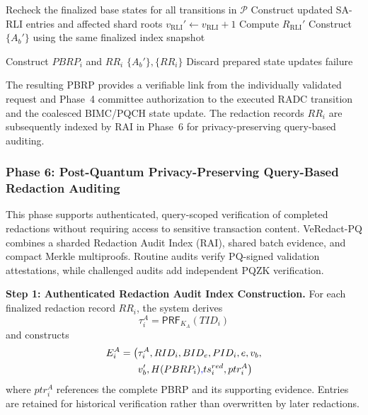 \documentclass[lettersize,journal]{IEEEtran}
\begin{document}
\begin{algorithm}[t]
\begin{algorithmic}[1]
\State Recheck the finalized base states
for all transitions in $\mathcal{P}$
\State Construct updated SA-RLI entries
and affected shard roots
\State $v_{\mathrm{RLI}}'\gets
v_{\mathrm{RLI}}+1$
\State Compute $R_{\mathrm{RLI}}'$
\State Construct $\{A_b'\}$ using the
same finalized index snapshot

        \State Construct $PBRP_i$
        and $RR_i$
    \EndFor
    \State \Return
    $\{A_b'\},\{RR_i\}$
\Else
    \State Discard prepared state updates
    \State \Return failure
\EndIf
\end{algorithmic}
\end{algorithm}


The resulting PBRP provides a verifiable link from the individually
validated request and Phase~4 committee authorization to the executed
RADC transition and the coalesced BIMC/PQCH state update. The
redaction records ${RR_i}$ are subsequently indexed by RAI in
Phase~6 for privacy-preserving query-based auditing.


\subsubsection*{\textbf{Phase 6: Post-Quantum
Privacy-Preserving Query-Based Redaction Auditing}}

This phase supports authenticated, query-scoped
verification of completed redactions without
requiring access to sensitive transaction content.
VeRedact-PQ combines a sharded Redaction Audit
Index (RAI), shared batch evidence, and compact
Merkle multiproofs. Routine audits verify PQ-signed
validation attestations, while challenged audits
add independent PQZK verification.

\medskip
\noindent\textbf{Step 1: Authenticated Redaction
Audit Index Construction.}
For each finalized redaction record $RR_i$,
the system derives
\begin{equation}
\tau_i^A=
\mathsf{PRF}_{K_A}(TID_i)
\end{equation}
and constructs
\begin{equation}
\begin{aligned}
E_i^A=\big(
&\tau_i^A,RID_i,BID_e,PID_i,e,v_b,
\\&v_b',H(PBRP_i)\textcolor{blue}{,}
ts_i^{red},ptr_i^A\big)
\end{aligned}
\end{equation}
where $ptr_i^A$ references the complete
PBRP and its supporting evidence. Entries
are retained for historical verification
rather than overwritten by later redactions.
\end{document}
